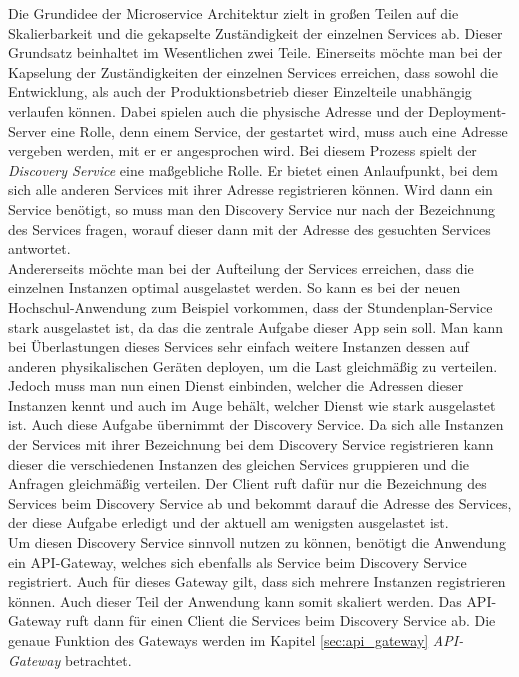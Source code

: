 Die Grundidee der Microservice Architektur zielt in großen Teilen auf die Skalierbarkeit und die gekapselte Zuständigkeit der einzelnen Services ab. Dieser Grundsatz beinhaltet im Wesentlichen zwei Teile. Einerseits möchte man bei der Kapselung der Zuständigkeiten der einzelnen Services erreichen, dass sowohl die Entwicklung, als auch der Produktionsbetrieb dieser Einzelteile unabhängig verlaufen können. Dabei spielen auch die physische Adresse und der Deployment-Server eine Rolle, denn einem Service, der gestartet wird, muss auch eine Adresse vergeben werden, mit er er angesprochen wird. Bei diesem Prozess spielt der \textit{Discovery Service} eine maßgebliche Rolle. Er bietet einen Anlaufpunkt, bei dem sich alle anderen Services mit ihrer Adresse registrieren können. Wird dann ein Service benötigt, so muss man den Discovery Service nur nach der Bezeichnung des Services fragen, worauf dieser dann mit der Adresse des gesuchten Services antwortet. 
\\
\linebreak
Andererseits möchte man bei der Aufteilung der Services erreichen, dass die einzelnen Instanzen optimal ausgelastet werden. So kann es bei der neuen Hochschul-Anwendung zum Beispiel vorkommen, dass der Stundenplan-Service stark ausgelastet ist, da das die zentrale Aufgabe dieser \ac{App} sein soll. Man kann bei Überlastungen dieses Services sehr einfach weitere Instanzen dessen auf anderen physikalischen Geräten deployen, um die Last gleichmäßig zu verteilen. Jedoch muss man nun einen Dienst einbinden, welcher die Adressen dieser Instanzen kennt und auch im Auge behält, welcher Dienst wie stark ausgelastet ist. Auch diese Aufgabe übernimmt der Discovery Service. Da sich alle Instanzen der Services mit ihrer Bezeichnung bei dem Discovery Service registrieren kann dieser die verschiedenen Instanzen des gleichen Services gruppieren und die Anfragen gleichmäßig verteilen. Der Client ruft dafür nur die Bezeichnung des Services beim Discovery Service ab und bekommt  darauf die Adresse des Services, der diese Aufgabe erledigt und der aktuell am wenigsten ausgelastet ist.
\\
\linebreak
Um diesen Discovery Service sinnvoll nutzen zu können, benötigt die Anwendung ein \ac{API}-Gateway, welches sich ebenfalls als Service beim Discovery Service registriert. Auch für dieses Gateway gilt, dass sich mehrere Instanzen registrieren können. Auch dieser Teil der Anwendung kann somit skaliert werden. Das \ac{API}-Gateway ruft dann für einen Client die Services beim Discovery Service ab. Die genaue Funktion des Gateways werden im Kapitel \ref{sec:api_gateway} \textit{API-Gateway} betrachtet. 

